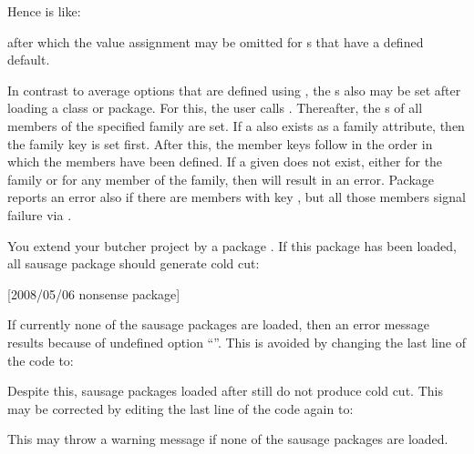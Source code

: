 \begin{Declaration}
\end{Declaration}
%
Hence  is like:
after which the value assignment may be omitted for s that have a
defined default.

In contrast to average options that are defined using ,
the s also may be set after loading a class or package. For this,
the user calls . Thereafter, the s of all
members of the specified family are set. If a  also exists as a
family attribute, then the family key is set first. After this, the member
keys follow in the order in which the members have been defined. If a given
 does not exist, either for the family or for any member of the
family, then  will result in an error. Package
 reports an error also if there are members with key
, but all those members signal failure via .
\begin{Example}
  You extend your butcher project by a package . If this
  package has been loaded, all sausage package should generate cold cut:
\begin{lstcode}
                  [2008/05/06 nonsense package]
  \relax
\end{lstcode}
  If currently none of the sausage packages are loaded, then an error
  message results because of undefined option ``''. This is
  avoided by changing the last line of the code to:
\begin{lstcode}[moretexcs={Family@Options}]
\end{lstcode}
  Despite this, sausage packages loaded after
   still do not produce cold cut. This may be corrected
  by editing the last line of the code again to:
\begin{lstcode}[moretexcs={Family@Options}]
\end{lstcode}
  This may throw a warning message if none of the sausage packages are loaded.
\end{Example}
%
%



